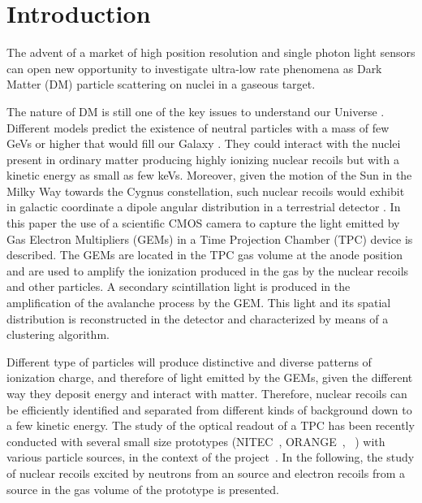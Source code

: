 \documentclass[12pt]{iopart}
\begin{document}
\section{Introduction}


The advent of a market of high position resolution and single photon
light sensors can open new opportunity to investigate ultra-low rate
phenomena as Dark Matter (DM) particle scattering on nuclei in a
gaseous target.

The nature of DM is still one of the key issues to understand our
Universe \cite{PhysRevLett.39.165,Undagoitia_2015}.  Different models
predict the existence of neutral particles with a mass of few GeVs or
higher that would fill our Galaxy
\cite{PhysRevLett.113.171301,PhysRevD.79.115016,doi:10.1142/S0217751X13300287,ZUREK201491}. They
could interact with the nuclei present in ordinary matter producing
highly ionizing nuclear recoils but with a kinetic energy as small as
few keVs. Moreover, given the motion of the Sun in the Milky Way
towards the Cygnus constellation, such nuclear recoils would exhibit
in galactic coordinate a dipole angular distribution in a terrestrial
detector \cite{MAYET20161}.  In this paper the use of a scientific
CMOS camera to capture the light emitted by Gas Electron Multipliers
(GEMs) in a Time Projection Chamber (TPC) device is described. The
GEMs are located in the TPC gas volume at the anode position and are
used to amplify the ionization produced in the gas by the nuclear
recoils and other particles. A secondary scintillation light is
produced in the amplification of the avalanche process by the GEM.
This light and its spatial distribution is reconstructed in the
detector and characterized by means of a clustering algorithm.


Different type of particles will produce distinctive and diverse
patterns of ionization charge, and therefore of light emitted by the
GEMs, given the different way they deposit energy and interact with
matter.
Therefore, nuclear recoils can be efficiently identified and separated
from different kinds of background down to a few \keV kinetic energy.
The study of the optical readout of a TPC has been recently conducted
with several small size prototypes (NITEC~\cite{JINST:nitec},
ORANGE~\cite{NIM:Marafinietal,bib:jinst_orange2},
\lemon~\cite{bib:eps, bib:ieee17,bib:elba}) with various particle
sources, in the context of the \cygno
project~\cite{Abritta_Costa_2020,CYGNOweb}. In the following, the
study of nuclear recoils excited by neutrons from an \ambe source and
electron recoils from a \fe source in the gas volume of the \lemon
prototype is presented.
\end{document}
